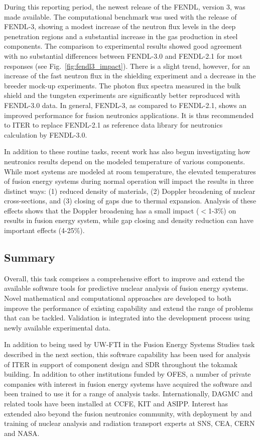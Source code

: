 During this reporting period, the newest release of the \gls{FENDL}, version
3, was made available.  The computational benchmark was used with the release
of \gls{FENDL}-3, showing a modest increase of the neutron flux levels in the
deep penetration regions and a substantial increase in the gas production in
steel components.  The comparison to experimental results showed good
agreement with no substantial differences between FENDL-3.0 and FENDL-2.1 for
most responses (see Fig.\ \ref{fig:fendl3_impact}).  There is a slight trend,
however, for an increase of the fast neutron flux in the shielding experiment
and a decrease in the breeder mock-up experiments. The photon flux spectra
measured in the bulk shield and the tungsten experiments are significantly
better reproduced with FENDL-3.0 data. In general, FENDL-3, as compared to
FENDL-2.1, shows an improved performance for fusion neutronics
applications. It is thus recommended to ITER to replace FENDL-2.1 as reference
data library for neutronics calculation by
FENDL-3.0.

In addition to these routine tasks, recent work has also begun investigating
how neutronics results depend on the modeled temperature of various
components.  While most systems are modeled at room temperature, the elevated
temperatures of fusion energy systems during normal operation will impact the
results in three distinct ways: (1) reduced density of materials, (2) Doppler
broadening of nuclear cross-sections, and (3) closing of gaps due to thermal
expansion.  Analysis of these effects shows that the Doppler broadening has a
small impact ($<$1-3\%) on results in fusion energy system, while gap closing
and density reduction can have important effects (4-25\%).

\subsection{Summary}

Overall, this task comprises a comprehensive effort to improve and extend the
available software tools for predictive nuclear analysis of fusion energy
systems.  Novel mathematical and computational approaches are developed to
both improve the performance of existing capability and extend the range of
problems that can be tackled.  Validation is integrated into the development
process using newly available experimental data.

In addition to being used by \gls{UW-FTI} in the Fusion Energy Systems Studies
task described in the next section, this software capability has been used for
analysis of ITER in support of component design and \gls{SDR} throughout the
tokamak building.  In addition to other institutions funded by OFES, a number
of private companies with interest in fusion energy systems have acquired the
software and been trained to use it for a range of analysis tasks.
Internationally, \gls{DAGMC} and related tools have been installed at CCFE,
KIT and ASIPP.  Interest has extended also beyond the fusion neutronics
community, with deployment by and training of nuclear analysis and radiation
transport experts at \gls{SNS}, CEA, CERN and NASA.

